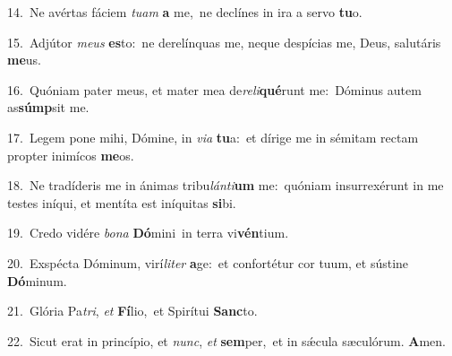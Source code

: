 {\numbfont\textcolor{\numbcolor}{14.}}~Ne avértas fáciem \textit{tu}\-\textit{am} \textbf{a} me,~\star ne declínes in ira a servo \textbf{tu}\-o.\par
{\numbfont\textcolor{\numbcolor}{15.}}~Adjútor \textit{me}\-\textit{us} \textbf{es}\-to:~\star ne derelínquas me, neque despícias me, Deus, salutáris \textbf{me}\-us.\par
{\numbfont\textcolor{\numbcolor}{16.}}~Quóniam pater meus, et mater mea de\-\textit{re}\-\textit{li}\textbf{qué}runt me:~\star Dóminus autem as\-\textbf{súmp}\-sit me.\par
{\numbfont\textcolor{\numbcolor}{17.}}~Legem pone mihi, Dómine, in \textit{vi}\-\textit{a} \textbf{tu}\-a:~\star et dírige me in sémitam rectam propter inimícos \textbf{me}\-os.\par
{\numbfont\textcolor{\numbcolor}{18.}}~Ne tradíderis me in ánimas tribu\-\textit{lán}\-\textit{ti}\textbf{um} me:~\star quóniam insurrexérunt in me testes iníqui, et mentíta est iníquitas \textbf{si}\-bi.\par
{\numbfont\textcolor{\numbcolor}{19.}}~Credo vidére \textit{bo}\-\textit{na} \textbf{Dó}\-mini~\star in terra vi\-\textbf{vén}\-tium.\par
{\numbfont\textcolor{\numbcolor}{20.}}~Exspécta Dóminum, virí\-\textit{li}\-\textit{ter} \textbf{a}\-ge:~\star et confortétur cor tuum, et sústine \textbf{Dó}\-minum.\par
{\numbfont\textcolor{\numbcolor}{21.}}~Glória Pa\-\textit{tri}\-, \textit{et} \textbf{Fí}\-lio,~\star et Spirítui \textbf{Sanc}\-to.\par
{\numbfont\textcolor{\numbcolor}{22.}}~Sicut erat in princípio, et \textit{nunc}\-, \textit{et} \textbf{sem}\-per,~\star et in sǽcula sæculórum. \textbf{A}\-men.\par

